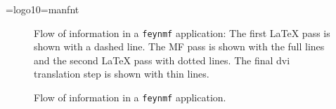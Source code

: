 \font\logo=logo10\font\manfnt=manfnt
\def\MF{{\logo MF}}

\begin{figure}
  \begin{center}
  
  \caption{Flow of information in a {\tt feynmf} application:  The
     first \LaTeX{} pass is shown with a dashed line.  The \MF{}
     pass is shown with the full lines and the second \LaTeX{} pass
     with dotted lines.  The final dvi translation step is shown with
     thin lines.}
  \end{center}
\end{figure}
\begin{figure}
  \begin{center}
  
  \caption{Flow of information in a {\tt feynmf} application.}
  \end{center}
\end{figure}

